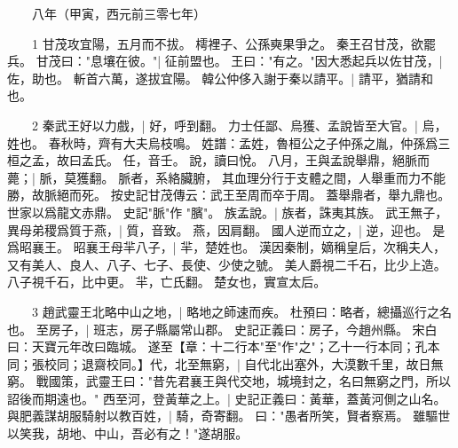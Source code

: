 　　八年（甲寅，西元前三零七年）

　　1 甘茂攻宜陽，五月而不拔。
	樗裡子、公孫奭果爭之。
	秦王召甘茂，欲罷兵。
	甘茂曰："息壤在彼。"|{
	征前盟也。
}
王曰："有之。"因大悉起兵以佐甘茂，|{
	佐，助也。
}
斬首六萬，遂拔宜陽。
	韓公仲侈入謝于秦以請平。|{
	請平，猶請和也。
}

　　2 秦武王好以力戲，|{
	好，呼到翻。
}
力士任鄙、烏獲、孟說皆至大官。|{
	烏，姓也。
	春秋時，齊有大夫烏枝鳴。
	姓譜：孟姓，魯桓公之子仲孫之胤，仲孫爲三桓之孟，故曰孟氏。
	任，音壬。
	說，讀曰悅。
}
八月，王與孟說舉鼎，絕脈而薨；|{
	脈，莫獲翻。
	脈者，系絡臟腑， 其血理分行于支體之間，人舉重而力不能勝，故脈絕而死。
	按史記甘茂傳云：武王至周而卒于周。
	蓋舉鼎者，舉九鼎也。
	世家以爲龍文赤鼎。
	史記"脈"作 "臏"。
}
族孟說。|{
	族者，誅夷其族。
}
武王無子，異母弟稷爲質于燕，|{
	質，音致。
	燕，因肩翻。
}
國人逆而立之，|{
	逆，迎也。
}
是爲昭襄王。
	昭襄王母羋八子，|{
	羋，楚姓也。
	漢因秦制，嫡稱皇后，次稱夫人，又有美人、良人、八子、七子、長使、少使之號。
	美人爵視二千石，比少上造。
	八子視千石，比中更。
	羋，亡氏翻。
}
楚女也，實宣太后。


　　3 趙武靈王北略中山之地，|{
	略地之師速而疾。
	杜預曰：略者，總攝巡行之名也。
}
至房子，|{
	班志，房子縣屬常山郡。
	史記正義曰：房子，今趙州縣。
	宋白曰：天寶元年改曰臨城。
}
遂至【章：十二行本"至"作"之"；乙十一行本同；孔本同；張校同；退齋校同。】代，北至無窮，|{
	自代北出塞外，大漠數千里，故日無窮。
	戰國策，武靈王曰："昔先君襄王與代交地，城境封之，名曰無窮之門，所以詔後而期遠也。"
	}
西至河，登黃華之上。|{
	史記正義曰：黃華，蓋黃河側之山名。
}
與肥義謀胡服騎射以教百姓，|{
	騎，奇寄翻。
}
曰："愚者所笑，賢者察焉。
	雖驅世以笑我，胡地、中山，吾必有之！"遂胡服。


